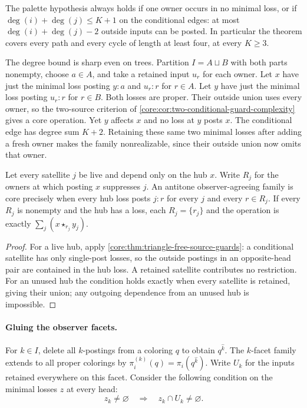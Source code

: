 The palette hypothesis always holds if one owner occurs in no minimal
loss, or if $\deg(i)+\deg(j)\le K+1$ on the conditional edges: at
most $\deg(i)+\deg(j)-2$ outside inputs can be posted. In particular
the theorem covers every path and every cycle of length at least four,
at every $K\ge3$.

The degree bound is sharp even on trees. Partition $I=A\sqcup B$
with both parts nonempty, choose $a\in A$, and take a retained input
$u_r$ for each owner. Let $x$ have just the minimal loss posting
$y:a$ and $u_r:r$ for $r\in A$. Let $y$ have just the minimal loss
posting $u_r:r$ for $r\in B$. Both losses are proper.
Their outside union uses every owner, so the two-source criterion
of \cref{core:cor:two-conditional-guard-complexity} gives a core
operation. Yet $y$ affects $x$ and no loss at $y$ posts $x$.
The conditional edge has degree sum $K+2$. Retaining these same two
minimal losses after adding a fresh owner makes the family
nonrealizable, since their outside union now omits that owner.

\begin{corollary}\label{core:thm:star-source-guards}
Let every satellite $j$ be live and depend only on the hub $x$.
Write $R_j$ for the owners at which posting $x$ suppresses $j$.
An antitone observer-agreeing family is core precisely when every
hub loss posts $j:r$ for every $j$ and every $r\in R_j$.
If every $R_j$ is nonempty and the hub has a loss, each
$R_j=\{r_j\}$ and the operation is exactly $\sum_j(x\star_{r_j}y_j)$.
\end{corollary}
\begin{proof}
For a live hub, apply \cref{core:thm:triangle-free-source-guards}:
a conditional satellite has only single-post losses, so the outside
postings in an opposite-head pair are contained in the hub loss.
A retained satellite contributes no restriction. For an unused hub
the condition holds exactly when every satellite is retained, giving
their union; any outgoing dependence from an unused hub is impossible.
\end{proof}

\paragraph{Gluing the observer facets.}
For $k\in I$, delete all $k$-postings from a coloring $q$ to obtain
$q^{\widehat k}$. The $k$-facet family extends to all proper colorings by
$\pi_i^{(k)}(q)=\pi_i(q^{\widehat k})$. Write $U_k$ for the inputs
retained everywhere on this facet. Consider the following condition
on the minimal losses $z$ at every head:
\begin{equation}\label{core:eq:facet-retained-posting}
             z_k\ne\varnothing\quad\Longrightarrow\quad
                         z_k\cap U_k\ne\varnothing .
\end{equation}

